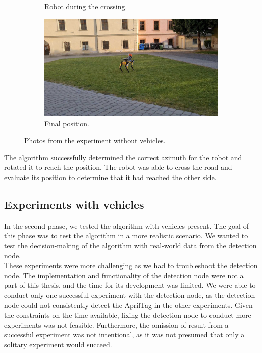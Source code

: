 \begin{figure}[ht]
\begin{subfigure}{0.49\textwidth}
                    \caption{Robot during the crossing.}
                \end{subfigure}
                \begin{subfigure}{0.49\textwidth}
                    \includegraphics[width=\textwidth]{images/final1.jpg}
                    \caption{Final position.}
                    \label{fig:final1}
                \end{subfigure}
                \caption{Photos from the experiment without vehicles.}
            \end{figure}
            The algorithm successfully determined the correct azimuth for the robot and rotated it to reach the position. The robot was able to cross the road and evaluate its position to determine that it had reached the other side.

    \subsection{Experiments with vehicles}
        In the second phase, we tested the algorithm with vehicles present. The goal of this phase was to test the algorithm in a more realistic scenario. We wanted to test the decision-making of the algorithm with real-world data from the detection node.\\
        These experiments were more challenging as we had to troubleshoot the detection node. The implementation and functionality of the detection node were not a part of this thesis, and the time for its development was limited. We were able to conduct only one successful experiment with the detection node, as the detection node could not consistently detect the AprilTag in the other experiments. Given the constraints on the time available, fixing the detection node to conduct more experiments was not feasible. Furthermore, the omission of result from a successful experiment was not intentional, as it was not presumed that only a solitary experiment would succeed.

